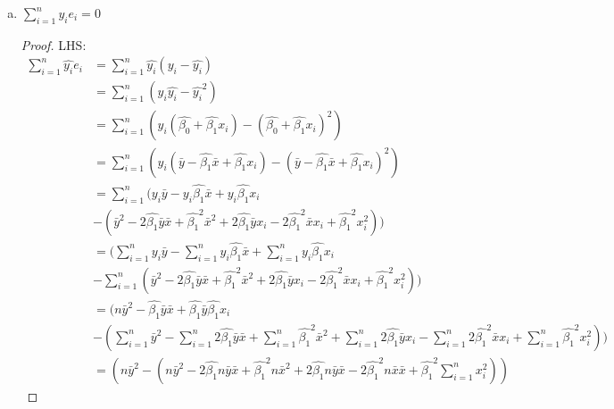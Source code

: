 \documentclass[12pt]{article}
\begin{document}
\begin{enumerate}[1.]
\begin{enumerate}[(a)]
\begin{proof}
\begin{align*}
                \end{align*}
                \[LHS = 0 = RHS\]
            \end{proof}
            $\therefore$ It is true that the independent variables $x_i$ is completly uncorrelated to the residuals $e_i$.
        \item $\sum_{i=1}^{n} \hat{y_i}e_i = 0$
            \begin{proof} 
                LHS$\colon$
                \begin{align*}
                    \sum_{i=1}^{n} \hat{y_i}e_i &= \sum_{i=1}^{n} \hat{y_i}(y_i - \hat{y_i}) \\
                    &= \sum_{i=1}^{n} (y_i\hat{y_i} - \hat{y_i}^2) \\
                    &= \sum_{i=1}^{n} (y_i(\hat{\beta_0} + \hat{\beta_1} x_i) - (\hat{\beta_0} + \hat{\beta_1} x_i)^2) \\
                    &= \sum_{i=1}^{n} (y_i(\bar{y} - \hat{\beta_1}\bar{x} + \hat{\beta_1} x_i) - (\bar{y} - \hat{\beta_1}\bar{x} + \hat{\beta_1} x_i)^2) \\
                    &= \sum_{i=1}^{n} (y_i\bar{y} - y_i\hat{\beta_1}\bar{x} + y_i\hat{\beta_1} x_i  \\
                    &- (\bar{y}^2 - 2\hat{\beta_1}\bar{y}\bar{x} + \hat{\beta_1}^2\bar{x}^2 + 2\hat{\beta_1}\bar{y}x_i - 2\hat{\beta_1}^2\bar{x}x_i + \hat{\beta_1}^2 x_i^2)) \\
                    &=  (\sum_{i=1}^{n}y_i\bar{y} - \sum_{i=1}^{n}y_i\hat{\beta_1}\bar{x} + \sum_{i=1}^{n}y_i\hat{\beta_1} x_i  \\
                    &- \sum_{i=1}^{n} (\bar{y}^2 - 2\hat{\beta_1}\bar{y}\bar{x} + \hat{\beta_1}^2\bar{x}^2 + 2\hat{\beta_1}\bar{y}x_i - 2\hat{\beta_1}^2\bar{x}x_i + \hat{\beta_1}^2 x_i^2)) \\
                    &= (n\bar{y}^2 - \hat{\beta_1}\bar{y}\bar{x} + \hat{\beta_1}\bar{y}\hat{\beta_1} x_i  \\
                    &- (\sum_{i=1}^{n} \bar{y}^2 - \sum_{i=1}^{n} 2\hat{\beta_1}\bar{y}\bar{x} + \sum_{i=1}^{n} \hat{\beta_1}^2\bar{x}^2 + \sum_{i=1}^{n}2\hat{\beta_1}\bar{y}x_i - \sum_{i=1}^{n}2\hat{\beta_1}^2\bar{x}x_i + \sum_{i=1}^{n}\hat{\beta_1}^2 x_i^2)) \\
                    &= (n\bar{y}^2 - (n\bar{y}^2 - 2\hat{\beta_1}n\bar{y}\bar{x} + \hat{\beta_1}^2n\bar{x}^2 + 2\hat{\beta_1}n\bar{y}\bar{x} - 2\hat{\beta_1}^2n\bar{x}\bar{x} + \hat{\beta_1}^2\sum_{i=1}^{n}x_i^2))
                \end{align*}
                

\end{proof}
\end{enumerate}
\end{enumerate}
\end{document}
